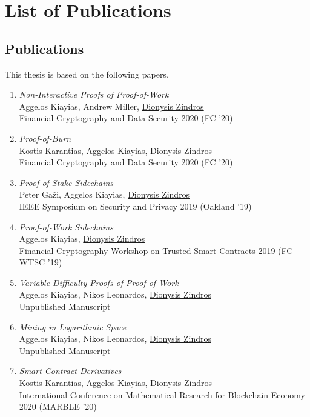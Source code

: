 \ifuniversity
\chapter*{List of Publications}
\thispagestyle{empty}
\else
\section*{Publications}
\fi

This thesis is based on the following papers.

\begin{enumerate}
  \item
    \emph{Non-Interactive Proofs of Proof-of-Work}\nocite{nipopows}\\
    Aggelos Kiayias, Andrew Miller, \underline{Dionysis Zindros}\\
    Financial Cryptography and Data Security 2020 (FC '20)
  \item
    \emph{Proof-of-Burn}\nocite{burn}\\
    Kostis Karantias, Aggelos Kiayias, \underline{Dionysis Zindros}\\
    Financial Cryptography and Data Security 2020 (FC '20)
  \item
    \emph{Proof-of-Stake Sidechains}\nocite{pos-sidechains}\\
    Peter Ga\v{z}i, Aggelos Kiayias, \underline{Dionysis Zindros}\\
    IEEE Symposium on Security and Privacy 2019 (Oakland '19)
  \item
    \emph{Proof-of-Work Sidechains}\nocite{pow-sidechains}\\
    Aggelos Kiayias, \underline{Dionysis Zindros}\\
    Financial Cryptography Workshop on Trusted Smart Contracts 2019 (FC WTSC '19)
  \item
    \emph{Variable Difficulty Proofs of Proof-of-Work}\nocite{varnipopows}\\
    Aggelos Kiayias, Nikos Leonardos, \underline{Dionysis Zindros}\\
    Unpublished Manuscript
  \item
    \emph{Mining in Logarithmic Space}\nocite{logspace}\\
    Aggelos Kiayias, Nikos Leonardos, \underline{Dionysis Zindros}\\
    Unpublished Manuscript
  \item
    \emph{Smart Contract Derivatives}\nocite{derivatives}\\
    Kostis Karantias, Aggelos Kiayias, \underline{Dionysis Zindros}\\
    International Conference on Mathematical Research for Blockchain Economy 2020 (MARBLE '20)\\
\end{enumerate}

